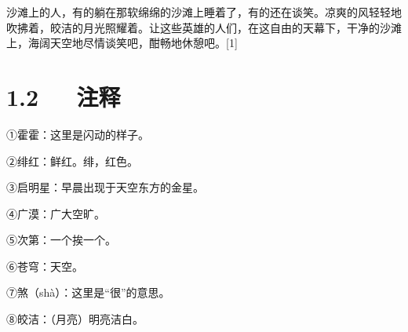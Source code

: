 \documentclass[letterpaper,12pt,english]{sphinxmanual}
\begin{document}
沙滩上的人，有的躺在那软绵绵的沙滩上睡着了，有的还在谈笑。凉爽的风轻轻地吹拂着，皎洁的月光照耀着。让这些英雄的人们，在这自由的天幕下，干净的沙滩上，海阔天空地尽情谈笑吧，酣畅地休憩吧。{[}1{]}


\section{1.2   注释}
\label{\detokenize{p01_u6563_u6587/_u5cfb_u9752-_u6d77_u6ee8_u4ef2_u590f_u591c:id4}}
①霍霍：这里是闪动的样子。

②绯红：鲜红。绯，红色。

③启明星：早晨出现于天空东方的金星。

④广漠：广大空旷。

⑤次第：一个挨一个。

⑥苍穹：天空。

⑦煞（shà）：这里是“很”的意思。

⑧皎洁：（月亮）明亮洁白。
\end{document}
